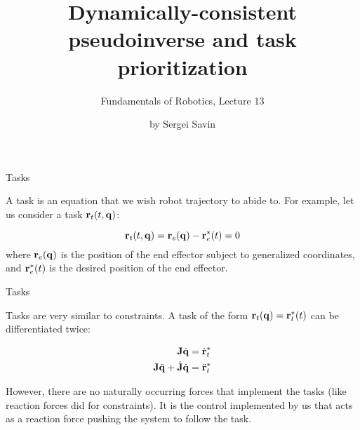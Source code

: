 \documentclass{beamer}
\title{Dynamically-consistent pseudoinverse and task prioritization}
\subtitle{Fundamentals of Robotics, Lecture 13}
\author{by Sergei Savin}
\date{\mydate}
\begin{document}
\maketitle





\begin{frame}{Tasks}
	\begin{flushleft}
		
		A task is an equation that we wish robot trajectory to abide to. For example, let us consider a task $\mathbf{r}_t(t, \mathbf{q})$:
		
		\begin{equation}
			\mathbf{r}_t(t, \mathbf{q}) = \mathbf{r}_e(\mathbf{q}) - \mathbf{r}^*_e(t) = 0
		\end{equation} 
	where $\mathbf{r}_e(\mathbf{q})$ is the position of the end effector subject to generalized coordinates, and $\mathbf{r}^*_e(t)$ is the desired position of the end effector.
	
		
	\end{flushleft}
\end{frame}


\begin{frame}{Tasks}
	\begin{flushleft}
		
		Tasks are very similar to constraints. A task of the form $\mathbf{r}_t(\mathbf{q}) = \mathbf{r}^*_t(t)$ can be differentiated twice:
		
		\begin{align}
			\mathbf{J} \dot{\mathbf{q}} = \dot{\mathbf{r}}^*_t \\
			\mathbf{J}\ddot{\mathbf{q}} + \dot{\mathbf{J}} \dot{\mathbf{q}} = \ddot{\mathbf{r}}^*_t
		\end{align}
		
		However, there are no naturally occurring forces that implement the tasks (like reaction forces did for constraints). It is the control implemented by us that acts as a reaction force pushing the system to follow the task.
		
	\end{flushleft}
\end{frame}
\end{document}
